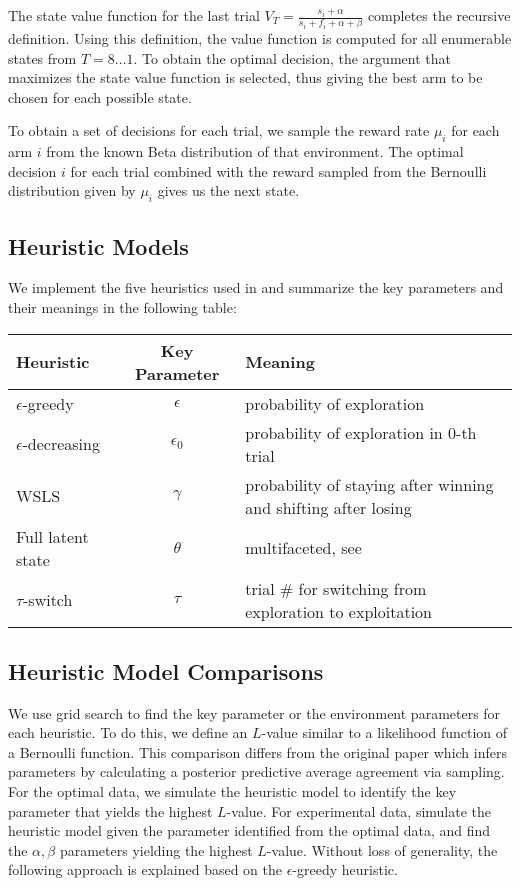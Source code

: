 The state value function for the last trial $V_T=\frac{s_i + \alpha}{s_i + f_i + \alpha + \beta}$ completes the recursive definition. Using this definition, the value function is computed for all enumerable states from $T=8\ldots1$. To obtain the optimal decision, the argument that maximizes the state value function is selected, thus giving the best arm to be chosen for each possible state. 

To obtain a set of decisions for each trial, we sample the reward rate $\mu_i$ for each arm $i$ from the known Beta distribution of that environment. The optimal decision $i$ for each trial combined with the reward sampled from the Bernoulli distribution given by $\mu_i$ gives us the next state.

\subsection{Heuristic Models}
We implement the five heuristics used in \cite{shunan2011} and summarize the key parameters and their meanings in the following table: 

\begin{table}[h]
\begin{tabular}{|l|c|l|}
\hline
\textbf{Heuristic} & \textbf{Key Parameter} & \textbf{Meaning} \\ \hline
$\epsilon$-greedy & $\epsilon$ & probability of exploration \\ \hline
$\epsilon$-decreasing & $\epsilon_0$ & probability of exploration in 0-th trial \\ \hline
WSLS & $\gamma$ & probability of staying after winning and shifting after losing \\ \hline
Full latent state & $\theta$ & multifaceted, see \cite{shunan2009} \\ \hline
$\tau$-switch & $\tau$ & trial \# for switching from exploration to exploitation \\ \hline
\end{tabular}
\end{table}

\subsection{Heuristic Model Comparisons}
We use grid search to find the key parameter or the environment parameters for each heuristic. To do this, we define an $L$-value similar to a likelihood function of a Bernoulli function. This comparison differs from the original paper which infers parameters by calculating a posterior predictive average agreement via sampling. For the optimal data, we simulate the heuristic model to identify the key parameter that yields the highest $L$-value. For experimental data, simulate the heuristic model given the parameter identified from the optimal data, and find the $\alpha,\beta$ parameters yielding the highest $L$-value. Without loss of generality, the following approach is explained based on the $\epsilon$-greedy heuristic. 

